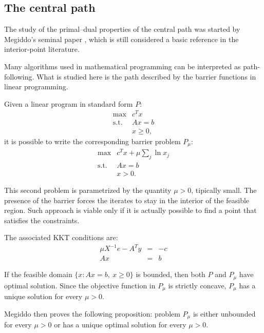 %
%
\subsection{The central path}


The study of the primal--dual properties of the central path 
was started by Megiddo's seminal paper \cite{Megiddo}, which is 
still considered a basic reference in the interior-point literature.

Many algorithms used in mathematical programming can be interpreted as path-following. What is studied here is the path described by the barrier functions in linear programming.

Given a linear program in standard form $P$:
\[
\begin{array}{rl}
  \max        & c^Tx \\
  \mbox{s.t.} & Ax = b \\
              & x \ge 0,
\end{array}
\]
it is possible to write the corresponding barrier problem $P_\mu$:
\[
\begin{array}{rl}
  \max        & c^Tx + \mu \sum_j \ln x_j \\
  \mbox{s.t.} & Ax = b \\
              & x > 0.
\end{array}
\]

This second problem is parametrized by the quantity $\mu > 0$, 
tipically small. The presence of the barrier forces the iterates 
to stay in the interior of the feasible region. Such approach is 
viable only if it is actually possible to find a point that 
satisfies the constraints.

The associated KKT conditions are:
\[
\begin{array}{lcc}
  \mu X^{-1}e -A^Ty & = & -c \\
   Ax               & = &  b
\end{array}
\]

If the feasible domain $\{ x: Ax=b,\: x\ge 0 \}$ is bounded, 
then both $P$ and $P_\mu$ have optimal solution. Since the 
objective function in $P_\mu$ is strictly concave, $P_\mu$ 
has a unique solution for every $\mu>0$.

Megiddo then proves the following proposition: problem $P_\mu$ 
is either unbounded for every  $\mu>0$ or has a unique optimal 
solution for every $\mu>0$.

